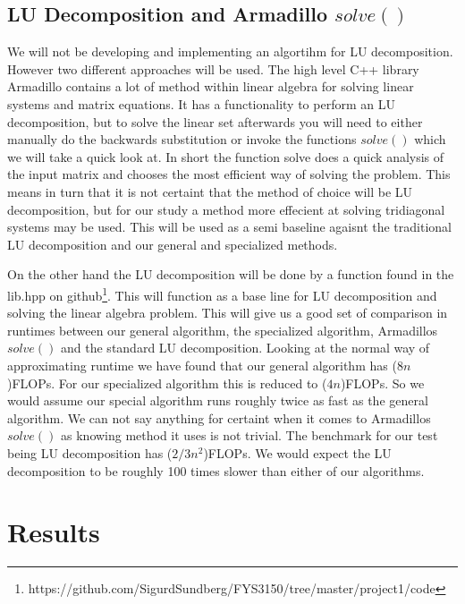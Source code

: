 \documentclass[10pt, a4paper]{amsart}
\begin{document}
\subsection{LU Decomposition and Armadillo $solve()$}
We will not be developing and implementing an algortihm for LU decomposition. However two different approaches will be used. The high level C++ library Armadillo\cite{Sanderson2016}\cite{DBLP:journals/corr/abs-1805-03380} contains a lot of method within linear algebra for solving linear systems and matrix equations. It has a functionality to perform an LU decomposition, but to solve the linear set afterwards you will need to either manually do the backwards substitution or invoke the functions $solve()$ which we will take a quick look at. In short the function solve does a quick analysis of the input matrix and chooses the most efficient way of solving the problem. This means in turn that it is not certaint that the method of choice will be LU decomposition, but for our study a method more effecient at solving tridiagonal systems may be used. This will be used as a semi baseline agaisnt the traditional LU decomposition and our general and specialized methods. 

On the other hand the LU decomposition will be done by a function found in the lib.hpp on github\footnote{https://github.com/SigurdSundberg/FYS3150/tree/master/project1/code}. This will function as a base line for LU decomposition and solving the linear algebra problem. This will give us a good set of comparison in runtimes between our general algorithm, the specialized algorithm, Armadillos $solve()$ and the standard LU decomposition. Looking at the normal way of approximating runtime we have found that our general algorithm has ($8n$)FLOPs. For our specialized algorithm this is reduced to ($4n$)FLOPs. So we would assume our special algorithm runs roughly twice as fast as the general algorithm. We can not say anything for certaint when it comes to Armadillos $solve()$ as knowing method it uses is not trivial. The benchmark for our test being LU decomposition has ($2/3 n^2$)FLOPs\cite{morten}. We would expect the LU decomposition to be roughly 100 times slower than either of our algorithms. 

\section{Results}
\end{document}
